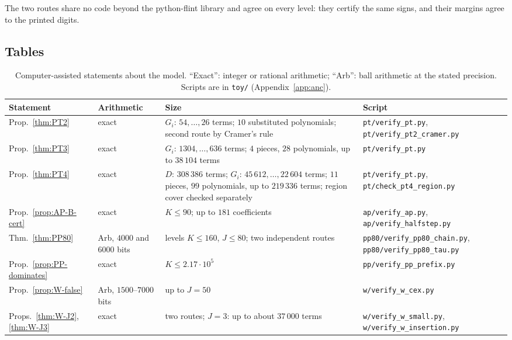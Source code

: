 The two routes share no code beyond the python-flint library and agree on every level: they certify the same signs,
and their margins agree to the printed digits.

\subsection{Tables}\label{ssec:app-tables}

\begin{table}[ht]
\centering\small
\caption{Computer-assisted statements about the model. ``Exact'': integer or rational arithmetic; ``Arb'': ball
arithmetic at the stated precision. Scripts are in \texttt{toy/} (Appendix~\ref{app:anc}).}\label{tab:app-toycert}
\begin{tabular}{@{}>{\raggedright\arraybackslash}p{}>{\raggedright\arraybackslash}p{}>{\raggedright\arraybackslash}p{}>{\raggedright\arraybackslash}p{}@{}}
\toprule
Statement & Arithmetic & Size & Script \\
\midrule
Prop.~\ref{thm:PT2} & exact & $G_i$: $54,\dots,26$ terms; $10$ substituted polynomials; second route by Cramer's rule &
\nolinkurl{pt/verify_pt.py}, \nolinkurl{pt/verify_pt2_cramer.py} \\
Prop.~\ref{thm:PT3} & exact & $G_i$: $1304,\dots,636$ terms; $4$ pieces, $28$ polynomials, up to $38\,104$ terms &
\nolinkurl{pt/verify_pt.py} \\
Prop.~\ref{thm:PT4} & exact & $D$: $308\,386$ terms; $G_i$: $45\,612,\dots,22\,604$ terms; $11$ pieces, $99$ polynomials,
up to $219\,336$ terms; region cover checked separately & \nolinkurl{pt/verify_pt.py}, \nolinkurl{pt/check_pt4_region.py} \\
Prop.~\ref{prop:AP-B-cert} & exact & $K\le90$; up to $181$ coefficients & \nolinkurl{ap/verify_ap.py},
\nolinkurl{ap/verify_halfstep.py} \\
Thm.~\ref{thm:PP80} & Arb, $4000$ and $6000$ bits & levels $K\le160$, $J\le80$; two independent routes &
\nolinkurl{pp80/verify_pp80_chain.py}, \nolinkurl{pp80/verify_pp80_tau.py} \\
Prop.~\ref{prop:PP-dominates} & exact & $K\le2.17\cdot10^5$ & \nolinkurl{pp/verify_pp_prefix.py} \\
Prop.~\ref{prop:W-false} & Arb, $1500$--$7000$ bits & up to $J=50$ & \nolinkurl{w/verify_w_cex.py} \\
Props.~\ref{thm:W-J2}, \ref{thm:W-J3} & exact & two routes; $J=3$: up to about $37\,000$ terms & \nolinkurl{w/verify_w_small.py},
\nolinkurl{w/verify_w_insertion.py} \\
\bottomrule
\end{tabular}
\end{table}

